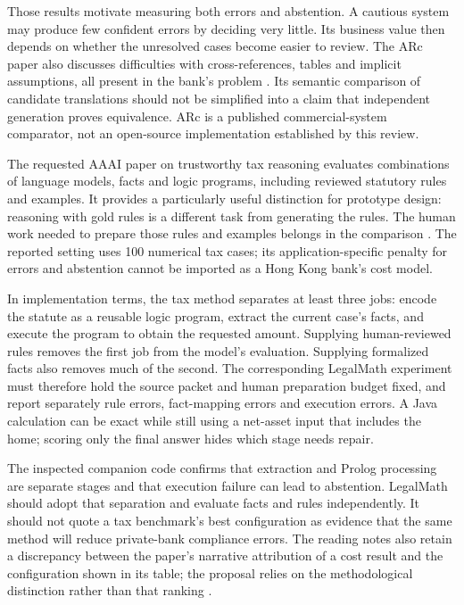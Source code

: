 \documentclass[12pt,a4paper,oneside,openany]{book}
\begin{document}
Those results motivate measuring both errors and abstention. A cautious system
may produce few confident errors by deciding very little. Its business value
then depends on whether the unresolved cases become easier to review. The ARc
paper also discusses difficulties with cross-references, tables and implicit
assumptions, all present in the bank's problem
\citep[sec.~5 and app.~A.1]{arc2025}. Its semantic comparison of candidate
translations should not be simplified into a claim that independent generation
proves equivalence. ARc is a published commercial-system comparator, not an
open-source implementation established by this review.

The requested AAAI paper on trustworthy tax reasoning evaluates combinations of
language models, facts and logic programs, including reviewed statutory rules and
examples. It provides a particularly useful distinction for prototype design:
reasoning with gold rules is a different task from generating the rules. The
human work needed to prepare those rules and examples belongs in the comparison
\citep[Tables~2--3]{jurayj2026,jurayj2025extended}. The reported setting uses
100 numerical tax cases; its application-specific penalty for errors and abstention
cannot be imported as a Hong Kong bank's cost model.

In implementation terms, the tax method separates at least three jobs: encode
the statute as a reusable logic program, extract the current case's facts, and
execute the program to obtain the requested amount. Supplying human-reviewed
rules removes the first job from the model's evaluation. Supplying formalized
facts also removes much of the second. The corresponding LegalMath experiment
must therefore hold the source packet and human preparation budget fixed, and
report separately rule errors, fact-mapping errors and execution errors. A Java
calculation can be exact while still using a net-asset input that includes the
home; scoring only the final answer hides which stage needs repair.

The inspected companion code confirms that extraction and Prolog processing are
separate stages and that execution failure can lead to abstention. LegalMath
should adopt that separation and evaluate facts and rules independently. It
should not quote a tax benchmark's best configuration as evidence that the same
method will reduce private-bank compliance errors. The reading notes also retain
a discrepancy between the paper's narrative attribution of a cost result and
the configuration shown in its table; the proposal relies on the methodological
distinction rather than that ranking \citep{libraryreview}.
\end{document}
